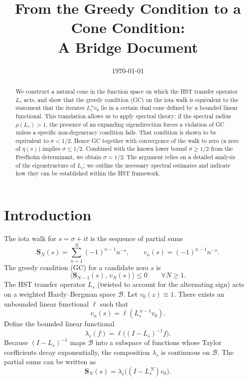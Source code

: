 \documentclass[11pt,a4paper]{article}
\title{\bf From the Greedy Condition to a Cone Condition: \\
A Bridge Document}
\author{}
\date{\today}
\begin{document}
\maketitle

\begin{abstract}
We construct a natural cone in the function space on which the HST transfer operator \(L_s\) acts, and show that the greedy condition (GC) on the iota walk is equivalent to the statement that the iterates \(L_s^{\,n} v_0\) lie in a certain dual cone defined by a bounded linear functional.  This translation allows us to apply spectral theory: if the spectral radius \(\rho(L_s) > 1\), the presence of an expanding eigendirection forces a violation of GC unless a specific non‑degeneracy condition fails.  That condition is shown to be equivalent to \(\sigma < 1/2\).  Hence GC together with convergence of the walk to zero (a zero of \(\eta(s)\)) implies \(\sigma \le 1/2\).  Combined with the known lower bound \(\sigma \ge 1/2\) from the Fredholm determinant, we obtain \(\sigma = 1/2\).  The argument relies on a detailed analysis of the eigenstructure of \(L_s\); we outline the necessary spectral estimates and indicate how they can be established within the HST framework.
\end{abstract}

\section{Introduction}
The iota walk for \(s = \sigma + it\) is the sequence of partial sums
\[
\mathbf{S}_N(s) = \sum_{n=1}^{N} (-1)^{n-1} n^{-s}, \qquad v_n(s) = (-1)^{n-1} n^{-s}.
\]
The greedy condition (GC) for a candidate zero \(s\) is
\[
\langle \mathbf{S}_{N-1}(s),\, v_N(s) \rangle \le 0 \qquad \forall N \ge 1.
\tag{1}
\]
The HST transfer operator \(L_s\) (twisted to account for the alternating sign) acts on a weighted Hardy–Bergman space \(\mathcal{B}\).  Let \(v_0(z) \equiv 1\).  There exists an unbounded linear functional \(\ell\) such that
\[
v_n(s) = \ell( L_s^{\,n-1} v_0 ).
\tag{2}
\]
Define the bounded linear functional
\[
\lambda_s(f) = \ell\big( (I - L_s)^{-1} f \big).
\]
Because \((I-L_s)^{-1}\) maps \(\mathcal{B}\) into a subspace of functions whose Taylor coefficients decay exponentially, the composition \(\lambda_s\) is continuous on \(\mathcal{B}\).  The partial sums can be written as
\[
\mathbf{S}_N(s) = \lambda_s\big( (I - L_s^{\,N}) v_0 \big).
\tag{3}
\]
\end{document}
